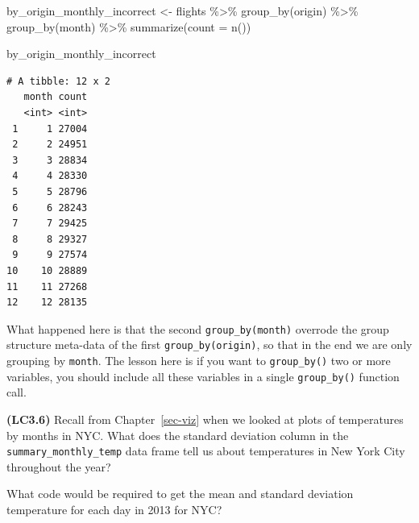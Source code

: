\documentclass[
  letterpaper,
  DIV=11,
  numbers=noendperiod]{scrreprt}
\newenvironment{Shaded}{\begin{snugshade}}{\end{snugshade}}
\newcommand{\AttributeTok}[1]{\textcolor[rgb]{0.40,0.45,0.13}{#1}}
\newcommand{\FunctionTok}[1]{\textcolor[rgb]{0.28,0.35,0.67}{#1}}
\newcommand{\NormalTok}[1]{\textcolor[rgb]{0.00,0.23,0.31}{#1}}
\newcommand{\OtherTok}[1]{\textcolor[rgb]{0.00,0.23,0.31}{#1}}
\newcommand{\SpecialCharTok}[1]{\textcolor[rgb]{0.37,0.37,0.37}{#1}}
\theoremstyle{definition}
\theoremstyle{remark}
\begin{document}
\begin{Shaded}
\begin{Highlighting}[]
\NormalTok{by\_origin\_monthly\_incorrect }\OtherTok{\textless{}{-}}\NormalTok{ flights }\SpecialCharTok{\%\textgreater{}\%} 
  \FunctionTok{group\_by}\NormalTok{(origin) }\SpecialCharTok{\%\textgreater{}\%} 
  \FunctionTok{group\_by}\NormalTok{(month) }\SpecialCharTok{\%\textgreater{}\%} 
  \FunctionTok{summarize}\NormalTok{(}\AttributeTok{count =} \FunctionTok{n}\NormalTok{())}

\NormalTok{by\_origin\_monthly\_incorrect}
\end{Highlighting}
\end{Shaded}

\begin{verbatim}
# A tibble: 12 x 2
   month count
   <int> <int>
 1     1 27004
 2     2 24951
 3     3 28834
 4     4 28330
 5     5 28796
 6     6 28243
 7     7 29425
 8     8 29327
 9     9 27574
10    10 28889
11    11 27268
12    12 28135
\end{verbatim}

What happened here is that the second \texttt{group\_by(month)} overrode
the group structure meta-data of the first \texttt{group\_by(origin)},
so that in the end we are only grouping by \texttt{month}. The lesson
here is if you want to \texttt{group\_by()} two or more variables, you
should include all these variables in a single \texttt{group\_by()}
function call.

\begin{tcolorbox}[enhanced jigsaw, coltitle=black, toprule=.15mm, bottomtitle=1mm, breakable, leftrule=.75mm, title={{🎯} Learning Check 3.5}, opacitybacktitle=0.6, colback=white, rightrule=.15mm, opacityback=0, toptitle=1mm, colbacktitle=quarto-callout-tip-color!10!white, colframe=quarto-callout-tip-color-frame, titlerule=0mm, arc=.35mm, bottomrule=.15mm, left=2mm]

\end{tcolorbox}

\textbf{(LC3.6)} Recall from Chapter~\ref{sec-viz} when we looked at
plots of temperatures by months in NYC. What does the standard deviation
column in the \texttt{summary\_monthly\_temp} data frame tell us about
temperatures in New York City throughout the year?

\begin{tcolorbox}[enhanced jigsaw, coltitle=black, toprule=.15mm, bottomtitle=1mm, breakable, leftrule=.75mm, title={{🎯} Learning Check 3.7}, opacitybacktitle=0.6, colback=white, rightrule=.15mm, opacityback=0, toptitle=1mm, colbacktitle=quarto-callout-tip-color!10!white, colframe=quarto-callout-tip-color-frame, titlerule=0mm, arc=.35mm, bottomrule=.15mm, left=2mm]
What code would be required to get the mean and standard deviation
temperature for each day in 2013 for NYC?
\end{tcolorbox}
\end{document}
